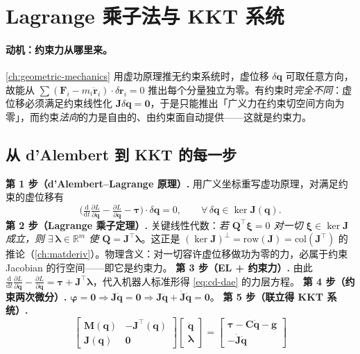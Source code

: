 \section{Lagrange 乘子法与 KKT 系统}
\label{sec:cd-kkt}

\paragraph{动机：约束力从哪里来。}
\cref{ch:geometric-mechanics} 用虚功原理推无约束系统时，虚位移 $\delta\mathbf q$ 可取任意方向，故能从 $\sum(\mathbf F_i-m_i\ddot{\mathbf r}_i)\cdot\delta\mathbf r_i=0$ 推出每个分量独立为零。有约束时\emph{完全不同}：虚位移必须满足约束线性化 $\mathbf J\delta\mathbf q=\mathbf 0$，于是只能推出「广义力在约束切空间方向为零」，而约束\emph{法向}的力是自由的、由约束面自动提供——这就是约束力。

\subsection{从 d'Alembert 到 KKT 的每一步}
\textbf{第 1 步（d'Alembert--Lagrange 原理）.} 用广义坐标重写虚功原理，对满足约束的虚位移有
\begin{equation}
  \Big(\tfrac{\mathrm d}{\mathrm dt}\tfrac{\partial L}{\partial\dot{\mathbf q}}-\tfrac{\partial L}{\partial\mathbf q}-\boldsymbol\tau\Big)\cdot\delta\mathbf q=0,\qquad\forall\,\delta\mathbf q\in\ker\mathbf J(\mathbf q).
  \label{eq:cd-dalembert}
\end{equation}
\textbf{第 2 步（Lagrange 乘子定理）.} 关键线性代数：\emph{若 $\mathbf Q^\top\boldsymbol\xi=0$ 对一切 $\boldsymbol\xi\in\ker\mathbf J$ 成立，则 $\exists\,\boldsymbol\lambda\in\mathbb R^m$ 使 $\mathbf Q=\mathbf J^\top\boldsymbol\lambda$}。这正是 $(\ker\mathbf J)^\perp=\mathrm{row}(\mathbf J)=\mathrm{col}(\mathbf J^\top)$ 的推论（\cref{ch:matderiv}）。物理含义：对一切容许虚位移做功为零的力，必属于约束 Jacobian 的行空间——即它是约束力。\;
\textbf{第 3 步（EL + 约束力）.} 由此 $\tfrac{\mathrm d}{\mathrm dt}\tfrac{\partial L}{\partial\dot{\mathbf q}}-\tfrac{\partial L}{\partial\mathbf q}=\boldsymbol\tau+\mathbf J^\top\boldsymbol\lambda$，代入机器人标准形得 \cref{eq:cd-dae} 的力层方程。\;
\textbf{第 4 步（约束两次微分）.} $\boldsymbol\varphi=\mathbf 0\Rightarrow\mathbf J\dot{\mathbf q}=\mathbf 0\Rightarrow\mathbf J\ddot{\mathbf q}+\dot{\mathbf J}\dot{\mathbf q}=\mathbf 0$。\;
\textbf{第 5 步（联立得 KKT 系统）.}
\begin{equation}
  \boxed{\;\begin{bmatrix}\mathbf M(\mathbf q) & -\mathbf J^\top(\mathbf q)\\ \mathbf J(\mathbf q) & \mathbf 0\end{bmatrix}\begin{bmatrix}\ddot{\mathbf q}\\ \boldsymbol\lambda\end{bmatrix}=\begin{bmatrix}\boldsymbol\tau-\mathbf C\dot{\mathbf q}-\mathbf g\\ -\dot{\mathbf J}\dot{\mathbf q}\end{bmatrix}\;}
  \label{eq:cd-kkt}
\end{equation}

